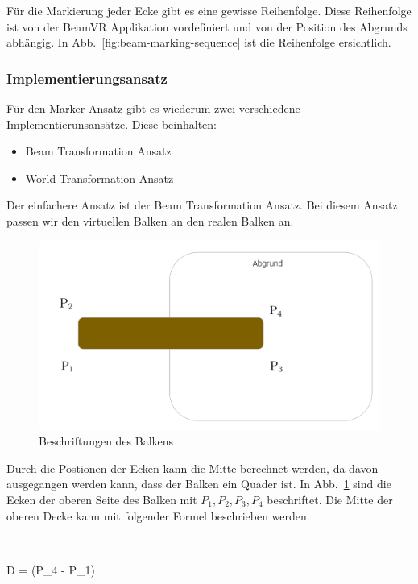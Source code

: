 Für die Markierung jeder Ecke gibt es eine gewisse Reihenfolge.
Diese Reihenfolge ist von der BeamVR Applikation vordefiniert und von der Position des Abgrunds abhängig.
In Abb.~\ref{fig:beam-marking-sequence} ist die Reihenfolge ersichtlich.

\subsubsection{Implementierungsansatz}

Für den Marker Ansatz gibt es wiederum zwei verschiedene Implementierunsansätze.
Diese beinhalten:

\begin{itemize}
    \item Beam Transformation Ansatz
    \item World Transformation Ansatz
\end{itemize}

Der einfachere Ansatz ist der Beam Transformation Ansatz.
Bei diesem Ansatz passen wir den virtuellen Balken an den realen Balken an.

\begin{figure}
    \centering
    \includegraphics[scale=0.25]{pics/beam-point-labeling}
    \caption{Beschriftungen des Balkens}
    \label{fig:beam-point-labeling}
\end{figure}


Durch die Postionen der Ecken kann die Mitte berechnet werden, da davon ausgegangen werden kann, dass der Balken ein Quader ist.
In Abb.~\ref{fig:beam-point-labeling} sind die Ecken der oberen Seite des Balken mit $P_{1}, P_{2}, P_{3}, P_{4}$ beschriftet.
Die Mitte der oberen Decke kann mit folgender Formel beschrieben werden.

$$

D = (P_{4} - P_{1})

